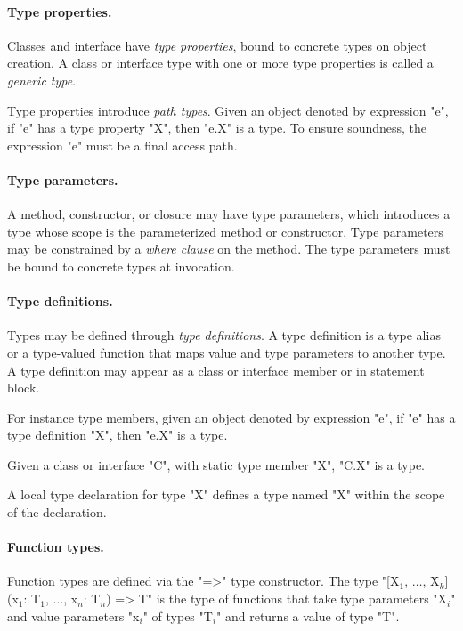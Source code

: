 \paragraph{Type properties.}
        Classes and interface have {\em type properties}, bound
        to concrete types on object creation.
        A class or interface type
        with one or more type properties is called a {\em
        generic type}.

        Type properties introduce {\em path types}.
        Given an object
        denoted by expression \xcd"e", if \xcd"e" has a 
        type property \xcd"X", then \xcd"e.X" is a type.
        To ensure soundness, the expression \xcd"e"
        must be a final access path.  

\paragraph{Type parameters.}
        A method, constructor, or closure may have type parameters, which
        introduces a type whose scope is the parameterized method or
        constructor. 
        Type parameters may be constrained by a {\em where
        clause} on the method.
        The type parameters must be bound to
        concrete types at invocation.

\paragraph{Type definitions.}
        Types may be defined through {\em type definitions}.
        A type definition is a type alias or a type-valued function
        that maps value and type parameters to another type.
        A type definition may appear as a class or interface
        member or in statement block.

        For instance type members, given an object
        denoted by expression \xcd"e", if \xcd"e" has a 
        type definition \xcd"X", then \xcd"e.X" is a type.

        Given a class or interface \xcd"C", with static type
        member \xcd"X", \xcd"C.X" is a type.

        A local type declaration for type \xcd"X" defines a type
        named \xcd"X" within the scope of the declaration.

\paragraph{Function types.}
        Function types are defined via the \xcd"=>" type
        constructor.  The type
  \xcdmath"[X$_1$, $\dots$, X$_k$](x$_1$: T$_1$, $\dots$, x$_n$: T$_n$) => T"
        is the type of functions that take type parameters
        \xcdmath"X$_i$"
        and value parameters
        \xcdmath"x$_i$"
        of types
        \xcdmath"T$_i$"
        and returns a value of type \xcd"T".

